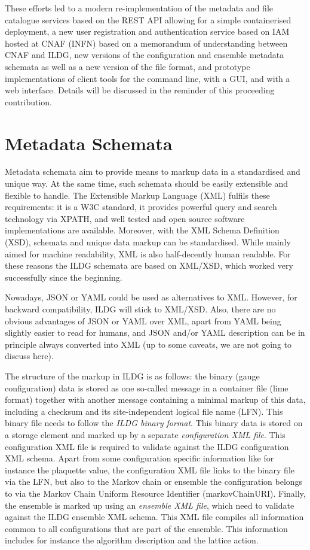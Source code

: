 \documentclass[a4paper,11pt]{article} \usepackage{pos} \usepackage{subcaption}
\begin{document}
These efforts led to a modern re-implementation of the metadata and
file catalogue services based on the REST API allowing for a simple
containerised deployment, a new user registration and authentication
service based on IAM hosted at CNAF (INFN) based on a memorandum of
understanding between CNAF and ILDG, new versions of the configuration
and ensemble metadata schemata as well as a new version of the file
format, and prototype implementations of client tools for the command
line, with a GUI, and with a web interface. Details will be discussed
in the reminder of this proceeding contribution.

\section{Metadata Schemata}

Metadata schemata aim to provide means to markup data in a
standardised and unique way. At the same time, such schemata should be
easily extensible and flexible to handle. The Extensible Markup
Language (XML) fulfils these requirements: it is a W3C standard, it
provides powerful query and search technology via XPATH, and well
tested and open source software implementations are
available. Moreover, with the XML Schema Definition (XSD), schemata
and unique data markup can be standardised. While mainly aimed
for machine readability, XML is also half-decently human readable.
For these reasons the ILDG schemata are based on XML/XSD, which worked
very successfully since the beginning.

Nowadays, JSON or YAML could be used as alternatives to XML. However, for
backward compatibility, ILDG will stick to XML/XSD. Also, there are no
obvious advantages of JSON or YAML over XML, apart from YAML being
slightly easier to read for humans, and JSON and/or YAML description
can be in principle always converted into XML (up to some caveats, we
are not going to discuss here).

The structure of the markup in ILDG is as follows: the binary (gauge
configuration) data is 
stored as one so-called message in a container file (lime format)
together with another message containing a minimal markup of this
data, including a checksum and its site-independent logical file name
(LFN). This binary file needs to follow the \emph{ILDG binary format}.
This binary data is stored on a storage element and marked up
by a separate \emph{configuration XML file}. This configuration XML file is
required to validate against the ILDG configuration XML schema. Apart
from some configuration specific information like for instance the
plaquette value, the configuration XML file links to the binary file
via the LFN, but also to the Markov chain or ensemble the
configuration belongs to via the Markov Chain Uniform Resource
Identifier (markovChainURI). Finally, the ensemble is marked up using
an \emph{ensemble XML file}, which need to validate against the ILDG
ensemble XML schema. This XML file compiles all information common to all
configurations that are part of the ensemble. This information
includes for instance the algorithm description and the lattice action.
\end{document}
